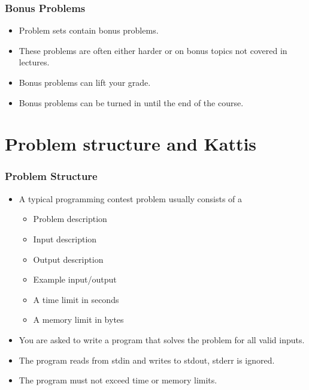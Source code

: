 \documentclass{beamer}
\begin{document}
\begin{frame}[plain]
	\frametitle{Bonus Problems}
	\begin{itemize}
		\item Problem sets contain bonus problems.
		\item These problems are often either harder or on bonus topics not covered in lectures.
        \item Bonus problems can lift your grade.
        \item Bonus problems can be turned in until the end of the course.
	\end{itemize}
\end{frame}


\section*{Problem structure and Kattis}

\begin{frame}[plain]
	\frametitle{Problem Structure}
	\begin{itemize}
		\item A typical programming contest problem usually consists of a
        \begin{itemize} 
            \item Problem description
            \item Input description
            \item Output description
            \item Example input/output
            \item A time limit in seconds
            \item A memory limit in bytes
        \end{itemize}
        \item You are asked to write a program that solves the problem for all valid inputs.
        \item The program reads from stdin and writes to stdout, stderr is ignored.
        \item The program must not exceed time or memory limits.
	\end{itemize}
\end{frame}
\end{document}
